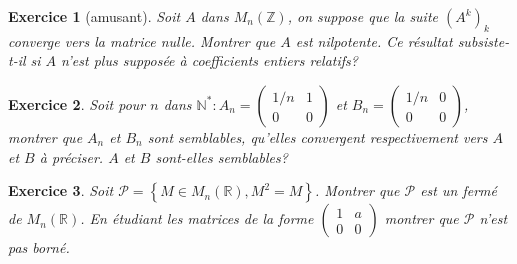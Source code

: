 \documentclass[12pt,a4paper]{article}
\newcommand{\R}{\mathbb{R}}
\newcommand{\Z}{\mathbb{Z}}
\newcommand{\N}{\mathbb{N}}
\theoremstyle{break}
\theoremstyle{break}
\newtheorem{Exo}{Exercice}
\begin{document}
\begin{Exo}[amusant]
	Soit $A$ dans $M_n(\Z)$, on suppose que la suite $(A^k)_k$ converge vers la matrice nulle. Montrer que $A$ est nilpotente. Ce résultat subsiste-t-il si $A$ n'est plus supposée à coefficients entiers relatifs?
\end{Exo}


\begin{Exo}
	Soit pour $n$ dans $\N^*:A_n=\begin{pmatrix}
		1/n & 1 \\
		0 & 0
	\end{pmatrix}
	$ et $B_n=\begin{pmatrix}
		1/n & 0 \\
		0 & 0
	\end{pmatrix}
	$, montrer que $A_n$ et $B_n$ sont semblables, qu'elles convergent respectivement vers $A$ et $B$ à préciser. $A$ et $B$ sont-elles semblables?
\end{Exo}

\begin{Exo}
	Soit $\mathcal{P}=\left\{M\in M_n(\R),M^2=M\right\}$. Montrer que $\mathcal{P}$ est un fermé de $M_n(\R)$. En étudiant les matrices de la forme $\begin{pmatrix}
		1 & a \\
		0 & 0
	\end{pmatrix}$ montrer que $\mathcal{P}$ n'est pas borné.
\end{Exo}	


	
	
\end{document}
